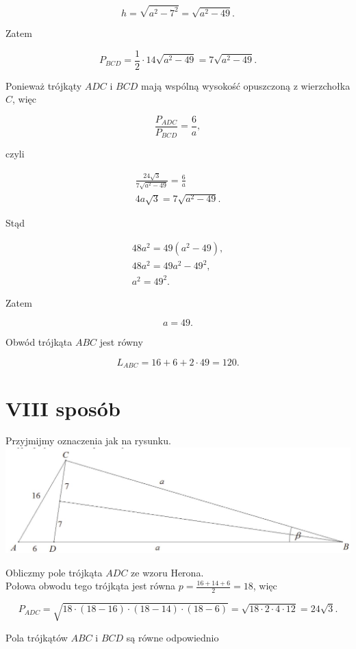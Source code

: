 \documentclass[10pt]{article}
\begin{document}
$$
h=\sqrt{a^{2}-7^{2}}=\sqrt{a^{2}-49} .
$$

Zatem

$$
P_{B C D}=\frac{1}{2} \cdot 14 \sqrt{a^{2}-49}=7 \sqrt{a^{2}-49} .
$$

Ponieważ trójkąty $A D C$ i $B C D$ mają wspólną wysokość opuszczoną z wierzchołka $C$, więc

$$
\frac{P_{A D C}}{P_{B C D}}=\frac{6}{a},
$$

czyli

$$
\begin{gathered}
\frac{24 \sqrt{3}}{7 \sqrt{a^{2}-49}}=\frac{6}{a} \\
4 a \sqrt{3}=7 \sqrt{a^{2}-49} .
\end{gathered}
$$

Stąd

$$
\begin{gathered}
48 a^{2}=49\left(a^{2}-49\right), \\
48 a^{2}=49 a^{2}-49^{2}, \\
a^{2}=49^{2} .
\end{gathered}
$$

Zatem

$$
a=49 .
$$

Obwód trójkąta $A B C$ jest równy

$$
L_{A B C}=16+6+2 \cdot 49=120 .
$$

\section*{VIII sposób}
Przyjmijmy oznaczenia jak na rysunku.\\
\includegraphics[max width=\textwidth, center]{2025_02_07_d712b9a47aa2c64928dbg-29}

Obliczmy pole trójkąta $A D C$ ze wzoru Herona.\\
Połowa obwodu tego trójkąta jest równa $p=\frac{16+14+6}{2}=18$, więc

$$
P_{A D C}=\sqrt{18 \cdot(18-16) \cdot(18-14) \cdot(18-6)}=\sqrt{18 \cdot 2 \cdot 4 \cdot 12}=24 \sqrt{3} .
$$

Pola trójkątów $A B C$ i $B C D$ są równe odpowiednio
\end{document}
